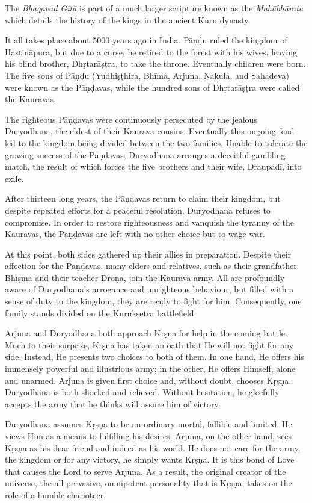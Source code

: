 The \textit{Bhagavad Gītā} is part of a much larger scripture known as the \textit{Mahābhārata} which details the history of the kings in the ancient Kuru dynasty. 

It all takes place about 5000 years ago in India. Pāṇḍu ruled the kingdom of Hastināpura, but due to a curse, he retired to the forest with his wives, leaving his blind brother, Dhṛtarāṣṭra, to take the throne. Eventually children were born. The five sons of Pāṇḍu (Yudhiṣṭhira, Bhīma, Arjuna, Nakula, and Sahadeva) were known as the Pāṇḍavas, while the hundred sons of Dhṛtarāṣṭra were called the Kauravas. 

The righteous Pāṇḍavas were continuously persecuted by the jealous Duryodhana, the eldest of their Kaurava cousins. Eventually this ongoing feud led to the kingdom being divided between the two families. Unable to tolerate the growing success of the Pāṇḍavas, Duryodhana arranges a deceitful gambling match, the result of which forces the five brothers and their wife, Draupadī, into exile.

After thirteen long years, the Pāṇḍavas return to claim their kingdom, but despite repeated efforts for a peaceful resolution, Duryodhana refuses to compromise. In order to restore righteousness and vanquish the tyranny of the Kauravas, the Pāṇḍavas are left with no other choice but to wage war.

At this point, both sides gathered up their allies in preparation. Despite their affection for the Pāṇḍavas, many elders and relatives, such as their grandfather Bhīṣma and their teacher Droṇa, join the Kaurava army. All are profoundly aware of Duryodhana’s arrogance and unrighteous behaviour, but filled with a sense of duty to the kingdom, they are ready to fight for him. Consequently, one family stands divided on the Kurukṣetra battlefield. 

Arjuna and Duryodhana both approach Kṛṣṇa for help in the coming battle. Much to their surprise, Kṛṣṇa has taken an oath that He will not fight for any side. Instead, He presents two choices to both of them. In one hand, He offers his immensely powerful and illustrious army; in the other, He offers Himself, alone and unarmed. Arjuna is given first choice and, without doubt, chooses Kṛṣṇa. Duryodhana is both shocked and relieved. Without hesitation, he gleefully accepts the army that he thinks will
assure him of victory.

Duryodhana assumes Kṛṣṇa to be an ordinary mortal, fallible and limited. He views Him as a means to fulfilling his desires. Arjuna, on the other hand, sees Kṛṣṇa as his dear friend and indeed as his world. He does not care for the army, the kingdom or for any victory, he simply wants Kṛṣṇa. It is this bond of Love that causes the Lord to serve Arjuna. As a result, the original creator of the universe, the all-pervasive, omnipotent personality that is Kṛṣṇa, takes on the role of a humble charioteer.



